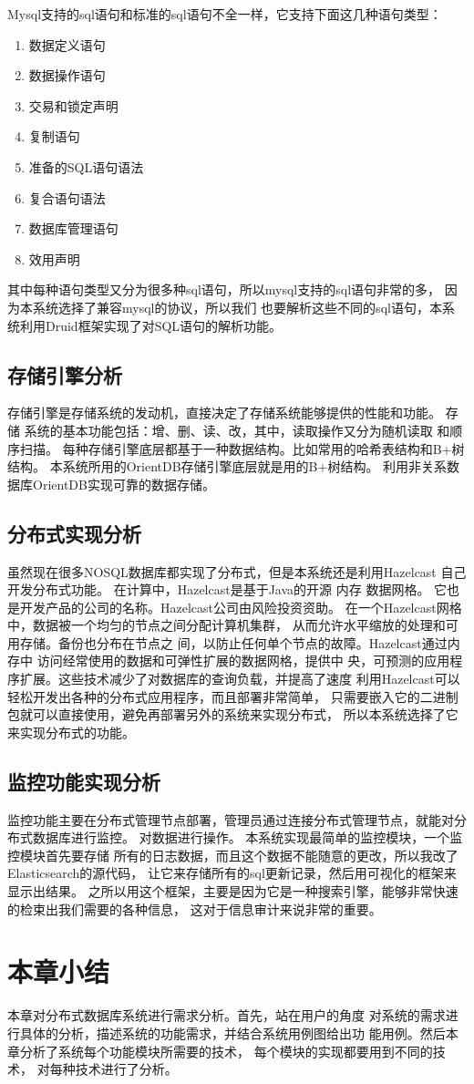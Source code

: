 Mysql支持的sql语句和标准的sql语句不全一样，它支持下面这几种语句类型：
\begin{enumerate}
	\item 数据定义语句     
\item 数据操作语句     
\item 交易和锁定声明     
\item 复制语句     
\item 准备的SQL语句语法     
\item 复合语句语法     
\item 数据库管理语句     
\item 效用声明  
\end{enumerate}   
其中每种语句类型又分为很多种sql语句，所以mysql支持的sql语句非常的多，
因为本系统选择了兼容mysql的协议，所以我们
也要解析这些不同的sql语句，本系统利用Druid框架实现了对SQL语句的解析功能。
\subsection{存储引擎分析}
存储引擎是存储系统的发动机，直接决定了存储系统能够提供的性能和功能。
存储
系统的基本功能包括：增、删、读、改，其中，读取操作又分为随机读取
和顺序扫描。
每种存储引擎底层都基于一种数据结构。比如常用的哈希表结构和B+树结构。
本系统所用的OrientDB存储引擎底层就是用的B+树结构。
利用非关系数据库OrientDB实现可靠的数据存储。
\subsection{分布式实现分析}
虽然现在很多NOSQL数据库都实现了分布式，但是本系统还是利用Hazelcast
自己开发分布式功能。
在计算中，Hazelcast是基于Java的开源 内存 数据网格。
它也是开发产品的公司的名称。Hazelcast公司由风险投资资助。
在一个Hazelcast网格中，数据被一个均匀的节点之间分配计算机集群，
从而允许水平缩放的处理和可用存储。备份也分布在节点之
间，以防止任何单个节点的故障。Hazelcast通过内存中
访问经常使用的数据和可弹性扩展的数据网格，提供中
央，可预测的应用程序扩展。这些技术减少了对数据库的查询负载，并提高了速度
利用Hazelcast可以轻松开发出各种的分布式应用程序，而且部署非常简单，
只需要嵌入它的二进制包就可以直接使用，避免再部署另外的系统来实现分布式，
所以本系统选择了它来实现分布式的功能。
\subsection{监控功能实现分析}
监控功能主要在分布式管理节点部署，管理员通过连接分布式管理节点，就能对分布式数据库进行监控。
对数据进行操作。
本系统实现最简单的监控模块，一个监控模块首先要存储
所有的日志数据，而且这个数据不能随意的更改，所以我改了Elasticsearch的源代码，
让它来存储所有的sql更新记录，然后用可视化的框架来显示出结果。
之所以用这个框架，主要是因为它是一种搜索引擎，能够非常快速的检束出我们需要的各种信息，
这对于信息审计来说非常的重要。
\section{本章小结}
本章对分布式数据库系统进行需求分析。首先，站在用户的角度
对系统的需求进行具体的分析，描述系统的功能需求，并结合系统用例图给出功
能用例。然后本章分析了系统每个功能模块所需要的技术，
每个模块的实现都要用到不同的技术，
对每种技术进行了分析。